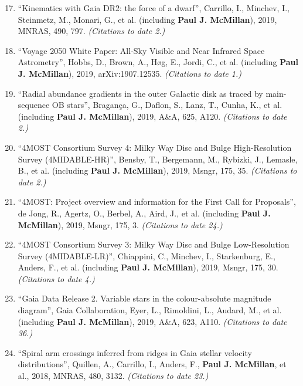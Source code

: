 \documentclass{resume}
\begin{document}
\begin{enumerate}
\setcounter{enumi}{16}
\item ``Kinematics with Gaia DR2: the force of a dwarf'', Carrillo, I., Minchev, I., Steinmetz, M., Monari, G., et al. (including \textbf{Paul J. McMillan}), 2019, MNRAS, 490, 797. \textit{(Citations to date 2.)}

\item ``Voyage 2050 White Paper: All-Sky Visible and Near Infrared Space Astrometry'', Hobbs, D., Brown, A., H{\o}g, E., Jordi, C., et al. (including \textbf{Paul J. McMillan}), 2019, arXiv:1907.12535. \textit{(Citations to date 1.)}

\item ``Radial abundance gradients in the outer Galactic disk as traced by main-sequence OB stars'', Bragan\c{c}a, G., Daflon, S., Lanz, T., Cunha, K., et al. (including \textbf{Paul J. McMillan}), 2019, A\&A, 625, A120. \textit{(Citations to date 2.)}

\item ``4MOST Consortium Survey 4: Milky Way Disc and Bulge High-Resolution Survey (4MIDABLE-HR)'', Bensby, T., Bergemann, M., Rybizki, J., Lemasle, B., et al. (including \textbf{Paul J. McMillan}), 2019, Msngr, 175, 35. \textit{(Citations to date 2.)}

\item ``4MOST: Project overview and information for the First Call for Proposals'', de Jong, R., Agertz, O., Berbel, A., Aird, J., et al. (including \textbf{Paul J. McMillan}), 2019, Msngr, 175, 3. \textit{(Citations to date 24.)}

\item ``4MOST Consortium Survey 3: Milky Way Disc and Bulge Low-Resolution Survey (4MIDABLE-LR)'', Chiappini, C., Minchev, I., Starkenburg, E., Anders, F., et al. (including \textbf{Paul J. McMillan}), 2019, Msngr, 175, 30. \textit{(Citations to date 4.)}

\item ``Gaia Data Release 2. Variable stars in the colour-absolute magnitude diagram'', Gaia Collaboration, Eyer, L., Rimoldini, L., Audard, M., et al. (including \textbf{Paul J. McMillan}), 2019, A\&A, 623, A110. \textit{(Citations to date 36.)}

\item ``Spiral arm crossings inferred from ridges in Gaia stellar velocity distributions'', Quillen, A., Carrillo, I., Anders, F., \textbf{Paul J. McMillan}, et al., 2018, MNRAS, 480, 3132. \textit{(Citations to date 23.)}


\end{enumerate}
\end{document}
